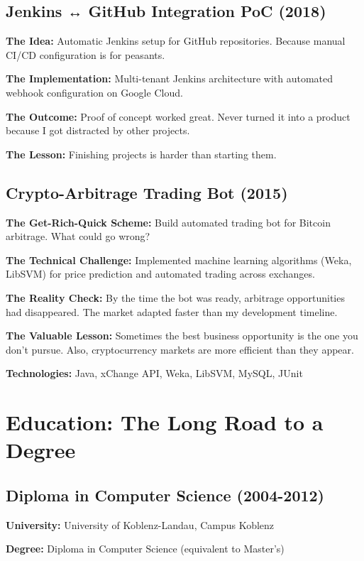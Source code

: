 \documentclass[11pt,a4paper]{article}
\begin{document}
\subsection{Jenkins ↔ GitHub Integration PoC (2018)}
\textbf{The Idea:} Automatic Jenkins setup for GitHub repositories. Because manual CI/CD configuration is for peasants.

\textbf{The Implementation:} Multi-tenant Jenkins architecture with automated webhook configuration on Google Cloud.

\textbf{The Outcome:} Proof of concept worked great. Never turned it into a product because I got distracted by other projects.

\textbf{The Lesson:} Finishing projects is harder than starting them.

\subsection{Crypto-Arbitrage Trading Bot (2015)}
\textbf{The Get-Rich-Quick Scheme:} Build automated trading bot for Bitcoin arbitrage. What could go wrong?

\textbf{The Technical Challenge:} Implemented machine learning algorithms (Weka, LibSVM) for price prediction and automated trading across exchanges.

\textbf{The Reality Check:} By the time the bot was ready, arbitrage opportunities had disappeared. The market adapted faster than my development timeline.

\textbf{The Valuable Lesson:} Sometimes the best business opportunity is the one you don't pursue. Also, cryptocurrency markets are more efficient than they appear.

\textbf{Technologies:} Java, xChange API, Weka, LibSVM, MySQL, JUnit

\newpage

\section{Education: The Long Road to a Degree}

\subsection{Diploma in Computer Science (2004-2012)}
\textbf{University:} University of Koblenz-Landau, Campus Koblenz

\textbf{Degree:} Diploma in Computer Science (equivalent to Master's)
\end{document}
